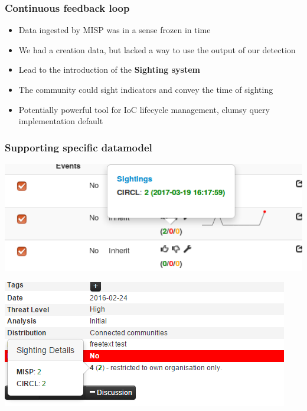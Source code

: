 \begin{frame}
  \frametitle{Continuous feedback loop}
  \begin{itemize}
    \item Data ingested by MISP was in a sense frozen in time
    \item We had a creation data, but lacked a way to use the output of our detection
    \item Lead to the introduction of the {\bf Sighting system}
    \item The community could sight indicators and convey the time of sighting
    \item Potentially powerful tool for IoC lifecycle management, clumsy query implementation default
  \end{itemize}
\end{frame}

\begin{frame}
  \frametitle{Supporting specific datamodel}
  \begin{center}
    \includegraphics[scale=0.5]{sighting-n.png}
  \end{center}
  \begin{center}
    \includegraphics[scale=0.60]{Sightings2.PNG}
  \end{center}  
\end{frame}

